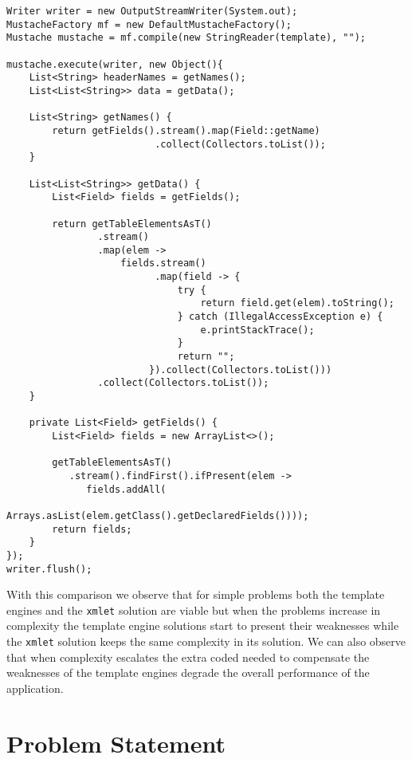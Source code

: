 \begin{minipage}{\linewidth}
\begin{lstlisting}[caption={Mustache With Iterable<TableElement>}, label={lst:mustacheex2code}]
Writer writer = new OutputStreamWriter(System.out);
MustacheFactory mf = new DefaultMustacheFactory();
Mustache mustache = mf.compile(new StringReader(template), "");

mustache.execute(writer, new Object(){
    List<String> headerNames = getNames();
    List<List<String>> data = getData();

    List<String> getNames() {
        return getFields().stream().map(Field::getName)
                          .collect(Collectors.toList());
    }

    List<List<String>> getData() {
        List<Field> fields = getFields();

        return getTableElementsAsT()
                .stream()
                .map(elem ->
                    fields.stream()
                          .map(field -> {
                              try {
                                  return field.get(elem).toString();
                              } catch (IllegalAccessException e) {
                                  e.printStackTrace();
                              }
                              return "";
                         }).collect(Collectors.toList()))
                .collect(Collectors.toList());
    }

    private List<Field> getFields() {
        List<Field> fields = new ArrayList<>();

        getTableElementsAsT()
           .stream().findFirst().ifPresent(elem -> 
              fields.addAll(
                  Arrays.asList(elem.getClass().getDeclaredFields())));
        return fields;
    }
});
writer.flush();
\end{lstlisting}
\end{minipage} 

\noindent
With this comparison we observe that for simple problems both the template engines and the \texttt{xmlet} solution are viable but when the problems increase in complexity the template engine solutions start to present their weaknesses while the \texttt{xmlet} solution keeps the same complexity in its solution. We can also observe that when complexity escalates the extra coded needed to compensate the weaknesses of the template engines degrade the overall performance of the application.

\section{Problem Statement}
\label{sec:problemstatement}

